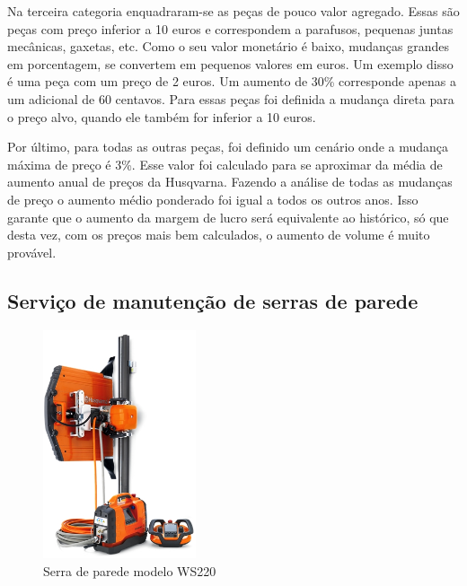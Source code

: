\documentclass[12pt]{article}
\begin{document}
	Na terceira categoria enquadraram-se as peças de pouco valor agregado. Essas são peças com preço inferior a 10 euros e correspondem a parafusos, pequenas juntas mecânicas, gaxetas, etc. Como o seu valor monetário é baixo, mudanças grandes em porcentagem, se convertem em pequenos valores em euros. Um exemplo disso é uma peça com um preço de 2 euros. Um aumento de 30\% corresponde apenas a um adicional de 60 centavos. Para essas peças foi definida a mudança direta para o preço alvo, quando ele também for inferior a 10 euros.

	Por último, para todas as outras peças, foi definido um cenário onde a mudança máxima de preço é 3\%. Esse valor foi calculado para se aproximar da média de aumento anual de preços da Husqvarna. Fazendo a análise de todas as mudanças de preço o aumento médio ponderado foi igual a todos os outros anos. Isso garante que o aumento da margem de lucro será equivalente ao histórico, só que desta vez, com os preços mais bem calculados, o aumento de volume é muito provável.
	

\subsection{Serviço de manutenção de serras de parede}

\begin{figure}[!ht]
	\centering
	\includegraphics[width=0.4\textwidth]{img/ws220_produto.png}
	\caption{Serra de parede modelo WS220}
	\label{fig:ws220_produto}
\end{figure}
\end{document}
